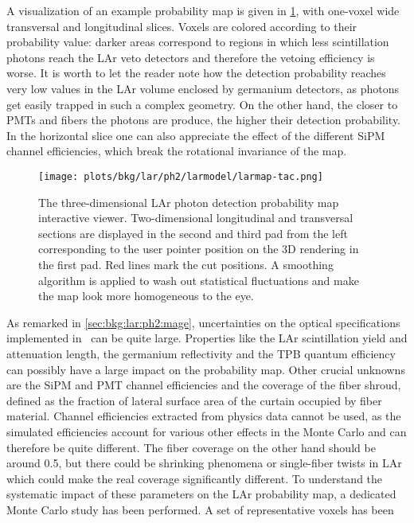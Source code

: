 A visualization of an example probability map is given in
\cref{fig:bkg:lar:ph2:larmap:tac}, with one-voxel wide transversal and longitudinal
slices. Voxels are colored according to their probability value: darker areas correspond
to regions in which less scintillation photons reach the LAr veto detectors and therefore
the vetoing efficiency is worse. It is worth to let the reader note how the detection
probability reaches very low values in the LAr volume enclosed by germanium detectors, as
photons get easily trapped in such a complex geometry. On the other hand, the closer to
PMTs and fibers the photons are produce, the higher their detection probability. In the
horizontal slice one can also appreciate the effect of the different SiPM channel
efficiencies, which break the rotational invariance of the map.
\begin{figure}
  \centering
  \texttt{[image: plots/bkg/lar/ph2/larmodel/larmap-tac.png]}
  \caption{%
    The three-dimensional LAr photon detection probability map interactive viewer.
    Two-dimensional longitudinal and transversal sections are displayed in the second and
    third pad from the left corresponding to the user pointer position on the 3D
    rendering in the first pad. Red lines mark the cut positions. A smoothing algorithm is
    applied to wash out statistical fluctuations and make the map look more homogeneous to
    the eye.
  }\label{fig:bkg:lar:ph2:larmap:tac}
\end{figure}
\newpar
As remarked in \cref{sec:bkg:lar:ph2:mage}, uncertainties on the optical specifications
implemented in \mage\ can be quite large. Properties like the LAr scintillation yield and
attenuation length, the germanium reflectivity and the TPB quantum efficiency can possibly
have a large impact on the probability map. Other crucial unknowns are the SiPM and PMT
channel efficiencies and the coverage of the fiber shroud, defined as the fraction of
lateral surface area of the curtain occupied by fiber material. Channel efficiencies
extracted from physics data cannot be used, as the simulated efficiencies account for
various other effects in the Monte Carlo and can therefore be quite different. The fiber
coverage on the other hand should be around 0.5, but there could be shrinking phenomena or
single-fiber twists in LAr which could make the real coverage significantly different.
\newpar
To understand the systematic impact of these parameters on the LAr probability map, a
dedicated Monte Carlo study has been performed. A set of representative voxels has been
